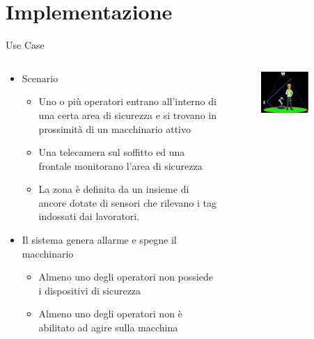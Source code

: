\documentclass{beamer}
\begin{document}
\section{Implementazione}
\begin{frame}{Use Case}
\begin{columns}
\begin{column}{0.5\textwidth}
\footnotesize
\begin{itemize}
	\item Scenario	
\begin{itemize}
\footnotesize
	\item Uno o più operatori entrano all’interno di una certa area di sicurezza e si trovano in prossimità di un macchinario attivo
	\item Una telecamera sul soffitto ed una frontale monitorano l’area di sicurezza
	\item La zona è definita da un insieme di ancore dotate di sensori che rilevano i tag indossati dai lavoratori. 
\end{itemize}
	\item Il sistema genera allarme e spegne il macchinario	
\begin{itemize}
\footnotesize
	\item Almeno uno degli operatori non possiede i dispositivi di sicurezza
	\item Almeno uno degli operatori non è abilitato ad agire sulla macchina
\end{itemize}
\end{itemize}
\end{column}
\begin{column}{0.5\textwidth}
	\begin{figure}	
	\centering
    \includegraphics[width=0.7\textwidth]{images/use-case.png}
    \end{figure}
\end{column}
\end{columns}
\end{frame}
\end{document}
